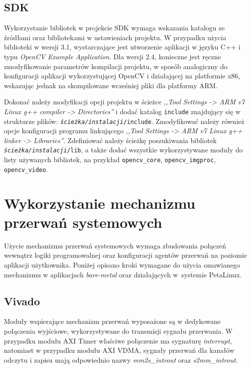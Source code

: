 \subsection{SDK}
Wykorzystanie bibliotek w projekcie SDK wymaga wskazania katalogu ze źródłami oraz bibliotekami w ustawieniach projektu.
W przypadku użycia biblioteki w wersji 3.1, wystarczające jest utworzenie aplikacji w języku C++ i typu \textit{OpenCV Example Application}.
Dla wersji 2.4, konieczne jest ręczne zmodyfikowanie parametrów kompilacji projektu, w sposób analogiczny do konfiguracji aplikacji wykorzystującej OpenCV i działającej na platformie x86, wskazując jednak na skompilowane wcześniej pliki dla platformy ARM.

Dokonać należy modyfikacji opcji projektu w ścieżce \emph{,,Tool Settings -> ARM v7 Linux g++ compiler -> Directories''} i dodać katalog \texttt{include} znajdujący się w strukturze plików: \texttt{\textit{ścieżka/instalacji}/include}.
Zmodyfikować należy również opcje konfiguracji programu linkującego \emph{,,Tool Settings -> ARM v7 Linux g++ linker -> Libraries''}. Zdefiniować należy ścieżkę poszukiwania bibliotek \texttt{\textit{ścieżka/instalacji}/lib}, a także dodać wszystkie wykorzystywane moduły do listy używanych bibliotek, na przykład \texttt{opencv\_core}, \texttt{opencv\_imgproc}, \texttt{opencv\_video}.

\section{Wykorzystanie mechanizmu przerwań systemowych}
\label{sec:interrupts-config}

Użycie mechanizmu przerwań systemowych wymaga zbudowania połączeń wewnątrz logiki programowalnej oraz konfiguracji agentów przerwań na poziomie aplikacji użytkownika. 
Poniżej opisano kroki wymagane do użycia omawianego mechanizmu w aplikacjach \textit{bare-metal} oraz działających w~systemie PetaLinux.

\subsection{Vivado}
Moduły wspierające mechanizm przerwań wyposażone są w dedykowane połączenia wyjściowe, wykorzystywane do transmisji sygnału przerwania. 
W przypadku modułu AXI Timer właściwe połączenie ma sygnaturę \emph{interrupt}, natomiast w przypadku modułu AXI VDMA, sygnały przerwań dla kanałów odczytu i zapisu mają odpowiednio nazwy \emph{mm2s\_introut} oraz \emph{s2mm\_introut}.

